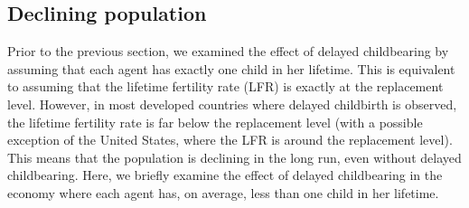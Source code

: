\documentclass{MBE}%
\begin{document}
{\subsection{Declining population}

Prior to the previous section, we examined the effect of delayed childbearing
by assuming that each agent has exactly one child in her lifetime. This is
equivalent to assuming that the lifetime fertility rate (LFR) is exactly at
the replacement level. However, in most developed countries where delayed
childbirth is observed, the lifetime fertility rate is far below the
replacement level (with a possible exception of the United States, where the
LFR is around the replacement level). This means that the population is
declining in the long run, even without delayed childbearing. Here, we briefly
examine the effect of delayed childbearing in the economy where each agent
has, on average, less than one child in her lifetime.




}
\end{document}
